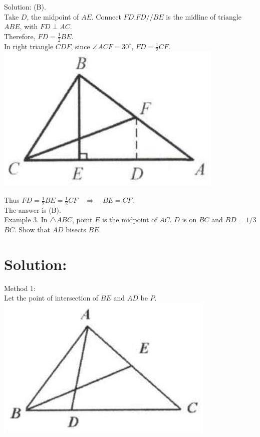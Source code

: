 \documentclass[10pt]{article}
\begin{document}
Solution: (B).\\
Take \(D\), the midpoint of \(A E\). Connect \(F D . F D / / B E\) is the midline of triangle \(A B E\), with \(F D \perp A C\).\\
Therefore, \(F D=\frac{1}{2} B E\).\\
In right triangle \(C D F\), since \(\angle A C F=30^{\circ}\), \(F D=\frac{1}{2} C F\).\\
\includegraphics[max width=\textwidth, center]{2025_04_17_97bc1f7e44d93c271a88g-036(2)}

Thus \(F D=\frac{1}{2} B E=\frac{1}{2} C F \quad \Rightarrow \quad B E=C F\).\\
The answer is (B).\\
Example 3. In \(\triangle A B C\), point \(E\) is the midpoint of \(A C\). \(D\) is on \(B C\) and \(B D=1 / 3\) \(B C\). Show that \(A D\) bisects \(B E\).

\section*{Solution:}
Method 1:\\
Let the point of intersection of \(B E\) and \(A D\) be \(P\).\\
\includegraphics[max width=\textwidth, center]{2025_04_17_97bc1f7e44d93c271a88g-036(1)}
\end{document}
